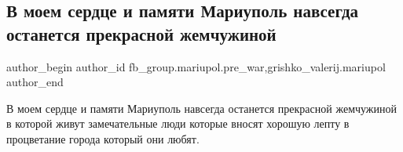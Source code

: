  
 
 
 
 

\subsection{В моем сердце и памяти Мариуполь навсегда останется прекрасной жемчужиной}
\label{sec:28_01_2023.fb.fb_group.mariupol.pre_war.1.v_moem_serdtse_i_pam}
 
\ifcmt
 author_begin
   author_id fb_group.mariupol.pre_war,grishko_valerij.mariupol
 author_end
\fi

В моем сердце и памяти Мариуполь навсегда останется прекрасной жемчужиной в
которой живут замечательные люди которые вносят хорошую лепту в процветание
города который они любят.

